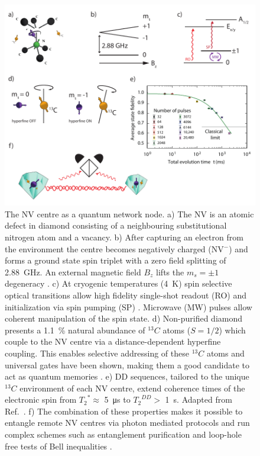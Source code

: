 \documentclass[a4paper]{article}
\begin{document}
\begin{figure}
	\centering
	\includegraphics[width=\textwidth]{images/figure1}
	\caption{The \ac{NV} centre as a quantum network node. 
		a) The \ac{NV} is an atomic defect in diamond consisting of a neighbouring substitutional nitrogen atom and a vacancy.
		b) After capturing an electron from the environment the centre becomes negatively charged (\ac{NV}${}^-$) and forms a ground state spin triplet with a zero field splitting of \SI{2.88}{GHz}. An external magnetic field $B_z$ lifts the $m_s = \pm 1$ degeneracy \cite{Doherty2013}.
		c) At cryogenic temperatures (\SI{4}{K}) spin selective optical transitions allow high fidelity single-shot readout (\textsc{RO}) and initialization via spin pumping (\textsc{SP}) \cite{Robledo2011}. Microwave (\acs{MW}) pulses allow coherent manipulation of the spin state.
		d) Non-purified diamond presents a \SI{1.1}{\percent} natural abundance of ${}^{13} C$ atoms ($S = 1/2$) which couple to the \ac{NV} centre via a distance-dependent hyperfine coupling. This enables selective addressing of these  ${}^{13} C$ atoms and universal gates have been shown, making them a good candidate to act as quantum memories \cite{Taminiau2014}.
		e) \acf{DD} sequences, tailored to the unique ${}^{13} C$ environment of each \ac{NV} centre, extend coherence times of the electronic spin from ${T_2}^* \approx $ \SI{5}{\micro s} to ${T_2}^{DD} > $ \SI{1}{s}. Adapted from Ref.~\cite{Abobeih2018}.
		f) The combination of these properties makes it possible to entangle remote \ac{NV} centres via photon mediated protocols and run complex schemes such as entanglement purification and loop-hole free tests of Bell inequalities \cite{Kalb2017, Hensen2015}.}
	\label{fig:nv_summary}
\end{figure}
\end{document}
